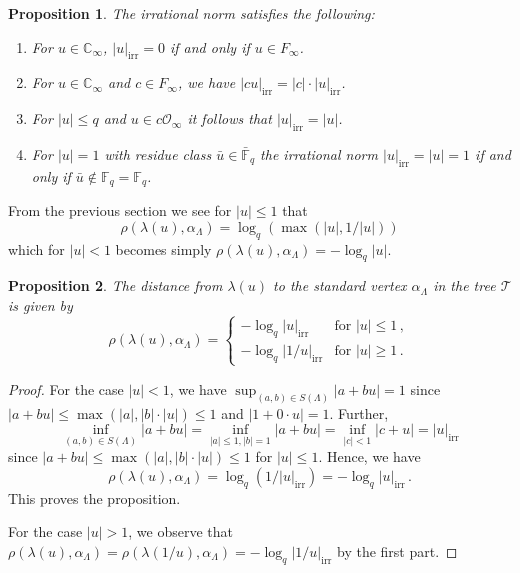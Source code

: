 \documentclass[12pt,a4paper]{article}
\theoremstyle{plain}
\newtheorem{proposition}{Proposition}[section]
\theoremstyle{definition}
\theoremstyle{remark}
\begin{document}
\begin{proposition}
The irrational norm satisfies the following:
\begin{enumerate}[label=(\arabic*)]
\item For $u \in \mathbb{C}_\infty$, $|u|_{\text{irr}} = 0$ if and only if 
$u \in F_\infty$.
\item For $u \in \mathbb{C}_\infty$ and $c \in F_\infty$, we have 
$|cu|_{\text{irr}} = |c| \cdot |u|_{\text{irr}}$.
\item For $|u| \leqslant q$ and $u \in c\mathcal{O}_\infty$ it follows that 
$|u|_{\text{irr}} = |u|$.
\item For $|u| = 1$ with residue class $\bar{u} \in \bar{\mathbb{F}}_q$ the 
irrational norm $|u|_{\text{irr}} = |u| = 1$ if and only if 
$\bar{u} \notin \mathbb{F}_q = \mathbb{F}_q$.
\end{enumerate}
\end{proposition}

From the previous section we see for $|u| \leqslant 1$ that
\[
\rho(\lambda(u), \alpha_\Lambda) = \log_q(\max(|u|, 1/|u|))
\]
which for $|u| < 1$ becomes simply $\rho(\lambda(u), \alpha_\Lambda) = -\log_q|u|$.

\begin{proposition}
The distance from $\lambda(u)$ to the standard vertex $\alpha_\Lambda$ in the 
tree $\mathcal{T}$ is given by
\[
\rho(\lambda(u), \alpha_\Lambda) =
\begin{cases}
-\log_q|u|_{\text{irr}} & \text{for } |u| \leqslant 1 \,,\\[2mm]
-\log_q|1/u|_{\text{irr}} & \text{for } |u| \geqslant 1 \,.
\end{cases}
\]
\end{proposition}

\begin{proof}
For the case $|u| < 1$, we have $\sup_{(a,b) \in S(\Lambda)} |a + bu| = 1$ 
since $|a + bu| \leqslant \max(|a|, |b| \cdot |u|) \leqslant 1$ and 
$|1 + 0 \cdot u| = 1$. Further,
\[
\inf_{(a,b) \in S(\Lambda)} |a + bu| = \inf_{|a| \leqslant 1, |b| = 1} |a + bu| = \inf_{|c| < 1} |c + u| = |u|_{\text{irr}}
\]
since $|a + bu| \leqslant \max(|a|, |b| \cdot |u|) \leqslant 1$ for $|u| \leqslant 1$.
Hence, we have
\[
\rho(\lambda(u), \alpha_\Lambda) = \log_q(1/|u|_{\text{irr}}) = -\log_q|u|_{\text{irr}} \,.
\]
This proves the proposition.

For the case $|u| > 1$, we observe that $\rho(\lambda(u), \alpha_\Lambda) = \rho(\lambda(1/u), \alpha_\Lambda) = -\log_q|1/u|_{\text{irr}}$ by the first part.
\end{proof}
\end{document}
